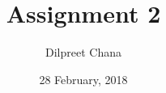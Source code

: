 \documentclass[letter,english,12pt,svgnames,titlepage]{report}
\begin{document}
	\date{28 February, 2018}
	\title{Assignment 2}
	\author{Dilpreet Chana}
	\maketitle  %
	\clearpage  %
	\begin{adjustbox}{max totalsize={.9\textwidth}{.8\textheight},center}

	\end{adjustbox}
\end{document}
